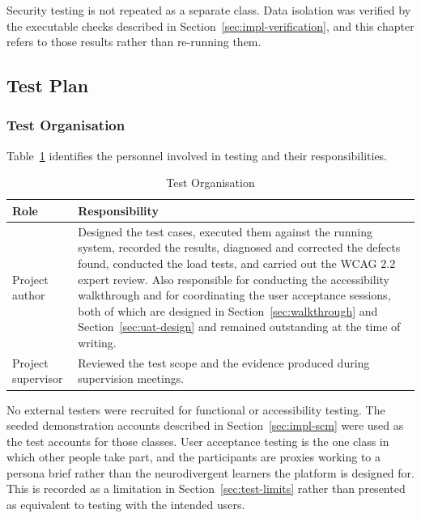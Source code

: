 \documentclass[12pt, oneside]{article} %
\begin{document}
Security testing is not repeated as a separate class. Data isolation was verified by the executable checks described in Section~\ref{sec:impl-verification}, and this chapter refers to those results rather than re-running them.

\subsection{Test Plan}

\subsubsection{Test Organisation}
\label{sec:test-org}

Table~\ref{tab:test_org} identifies the personnel involved in testing and their responsibilities.

\begin{table}[H]
\caption{Test Organisation}
\label{tab:test_org}
\vspace{-4mm}
\begin{center}
\renewcommand{\arraystretch}{1.2}
\footnotesize
\begin{tabular}{|>{\raggedright\arraybackslash}p{3.6cm}|>{\raggedright\arraybackslash}p{10.4cm}|}
\hline
\textbf{Role} & \textbf{Responsibility} \\
\hline \hline
Project author & Designed the test cases, executed them against the running system, recorded the results, diagnosed and corrected the defects found, conducted the load tests, and carried out the WCAG 2.2 expert review. Also responsible for conducting the accessibility walkthrough and for coordinating the user acceptance sessions, both of which are designed in Section~\ref{sec:walkthrough} and Section~\ref{sec:uat-design} and remained outstanding at the time of writing. \\ \hline
Project supervisor & Reviewed the test scope and the evidence produced during supervision meetings. \\ \hline
\end{tabular}
\end{center}
\end{table}

No external testers were recruited for functional or accessibility testing. The seeded demonstration accounts described in Section~\ref{sec:impl-scm} were used as the test accounts for those classes. User acceptance testing is the one class in which other people take part, and the participants are proxies working to a persona brief rather than the neurodivergent learners the platform is designed for. This is recorded as a limitation in Section~\ref{sec:test-limits} rather than presented as equivalent to testing with the intended users.
\end{document}
